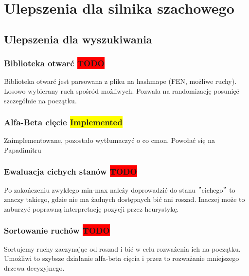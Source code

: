 \chapter{Ulepszenia dla silnika szachowego}
\label{ch:implementacja-silnika-szachowego}


\section{Ulepszenia dla wyszukiwania}
\label{sec:ulepszenia-dla-wyszukiwania}

\subsection{Biblioteka otwarć \colorbox{red}{TODO}}
\label{subsec:biblioteka-otwarc}

{
    \color{red}
    \large Biblioteka otwarć jest parsowana z pliku na hashmape (FEN, możliwe ruchy).
    Losowo wybierany ruch spośród możliwych.
    Pozwala na randomizację posunięć szczególnie na początku.

}

\subsection{Alfa-Beta cięcie \colorbox{yellow}{Implemented}}
\label{subsec:alfa-beta-ciecie}

{
    \color{red}
    \large Zaimplementowane, pozostało wytłumaczyć o co cmon.
Powołać się na Papadimitru
}


\subsection{Ewaluacja cichych stanów \colorbox{red}{TODO}}
\label{subsec:ewaluacja-cichych-stanow}

{
    \color{red}
    \large Po zakończeniu zwykłego min-max należy doprowadzić do stanu \("\)cichego\("\) to znaczy takiego, gdzie nie ma żadnych dostępnych bić ani roszad.
Inaczej może to zaburzyć poprawną interpretację pozycji przez heurystykę.
}


\subsection{Sortowanie ruchów \colorbox{red}{TODO}}
\label{subsec:sortowanie-ruchow}

{
    \color{red}
    \large Sortujemy ruchy zaczynając od roszad i bić w celu rozważenia ich na początku.
    Umożliwi to szybsze działanie alfa-beta cięcia i przez to rozważanie mniejszego drzewa decyzyjnego.
}

